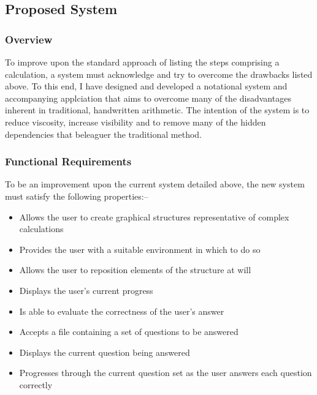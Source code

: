 \documentclass[12pt,twoside,notitlepage,xetex]{report}
\begin{document}
\subsection{Proposed System}

\subsubsection{Overview}


To improve upon the standard approach of listing the steps comprising a
calculation, a system must acknowledge and try to overcome the drawbacks listed
above.  To this end, I have designed and developed a notational system and
accompanying applciation that aims to overcome many of the disadvantages
inherent in traditional, handwritten arithmetic.  The intention of the system
is to reduce viscosity, increase visibility and to remove many of the hidden
dependencies that beleaguer the traditional method. %


\subsubsection{Functional Requirements}

To be an improvement upon the current system detailed above, the new system must
satisfy the following properties:-- %
\begin{itemize}
\item Allows the user to create graphical structures representative of complex calculations
\item Provides the user with a suitable environment in which to do so
\item Allows the user to reposition elements of the structure at will
\item Displays the user's current progress
\item Is able to evaluate the correctness of the user's answer
\item Accepts a file containing a set of questions to be answered
\item Displays the current question being answered
\item Progresses through the current question set as the user answers each question correctly
\end{itemize}
\end{document}

